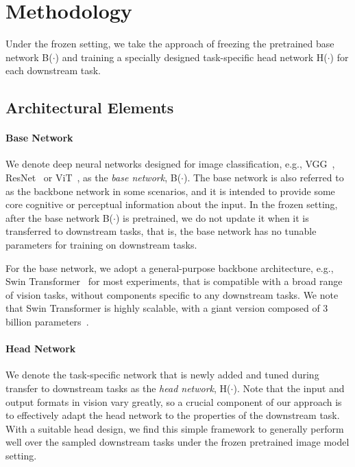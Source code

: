 \documentclass{article}
\begin{document}
\section{Methodology}
Under the frozen setting, we take the approach of freezing the pretrained base network B($\cdot$) and training a specially designed task-specific head network H($\cdot$) for each downstream task.

\subsection{Architectural Elements}

\paragraph{Base Network} We denote deep neural networks designed for image classification, e.g., VGG~\cite{simonyan2014vgg}, ResNet~\cite{he2016resnet} or ViT~\cite{dosovitskiy2020vit}, as the \emph{base network}, B($\cdot$). The base network is also referred to as the backbone network in some scenarios, and it is intended to provide some core cognitive or perceptual information about the input. In the frozen setting, after the base network B($\cdot$) is pretrained, we do not update it when it is transferred to downstream tasks, that is, the base network has no tunable parameters for training on downstream tasks.

For the base network, we adopt a general-purpose backbone architecture, e.g., Swin Transformer~\cite{liu2021swin} for most experiments, that is compatible with a broad range of vision tasks, without components specific to any downstream tasks. We note that Swin Transformer is highly scalable, with a giant version composed of 3 billion parameters~\cite{swinv2}.

\paragraph{Head Network} We denote the task-specific network that is newly added and tuned during transfer to downstream tasks as the \emph{head network}, H($\cdot$). Note that the input and output formats in vision vary greatly, so a crucial component of our approach is to effectively adapt the head network to the properties of the downstream task.
With a suitable head design, we find this simple framework to generally perform well over the sampled downstream tasks under the frozen pretrained image model setting.
\end{document}
